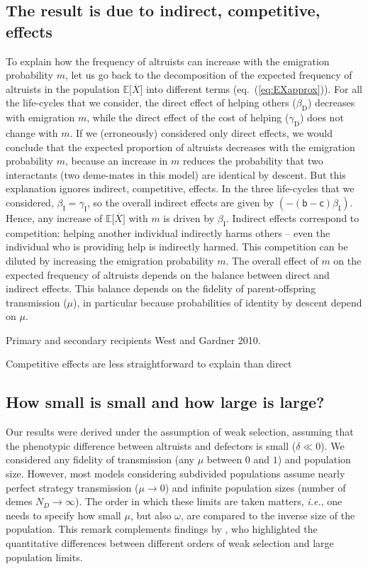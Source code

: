 \documentclass[11pt, letterpaper]{article}
\renewcommand{\eqref}[1]{\textup{{\normalfont eq.~(\ref{#1}}\normalfont)}}
\newcommand{\ie}{\textit{i.e.}}
\newcommand{\Esp}[1]{\mathbb{E}\big[ #1\big]}%
\newcommand{\bb}{\mathsf{b}}
\newcommand{\cc}{\mathsf{c}}
\newcommand{\direct}{\mathrm{D}}
\newcommand{\indirect}{\mathrm{I}}
\newcommand{\Qout}{Q_{\textrm{out}}}
\newcommand{\ndemes}{N_D}
\begin{document}
\subsection*{The result is due to indirect, competitive, effects}
To explain how the frequency of altruists can increase with the emigration probability $m$, let us go back to the decomposition of the expected frequency of altruists in the population $\Esp{\overline{X}}$ into different terms (\eqref{eq:EXapprox}). 
For all the life-cycles that we consider, the direct effect of helping others ($\beta_{\direct}$) decreases with emigration $m$, while the direct effect of the cost of helping ($\gamma_{\direct}$) does not change with $m$. 
If we (erroneously) considered only direct effects, we would conclude that the expected proportion of altruists decreases with the emigration probability $m$, because an increase in $m$ reduces the probability that two interactants (two deme-mates in this model) are identical by descent. 
But this explanation ignores indirect, competitive, effects. In the three life-cycles that we considered, $\beta_{\indirect} = \gamma_{\indirect}$, so the overall indirect effects are given by $(-(\bb-\cc) \beta_{\indirect})$. Hence, any increase of $\Esp{\overline{X}}$ with $m$ is driven by $\beta_{\indirect}$. Indirect effects correspond to competition: helping another individual indirectly harms others -- even the individual who is providing help is indirectly harmed. This competition can be diluted by increasing the emigration probability $m$. 
The overall effect of $m$ on the expected frequency of altruists depends on the balance between direct and indirect effects. This balance depends on the fidelity of parent-offspring transmission ($\mu$), in particular because probabilities of identity by descent depend on $\mu$. 

Primary and secondary recipients West and Gardner 2010. 

Competitive effects are less straightforward to explain than direct

\subsection*{How small is small and how large is large?}
Our results were derived under the assumption of weak selection, assuming that the phenotypic difference between altruists and defectors is small ($\delta \ll 0$). We considered any fidelity of transmission (any $\mu$ between $0$ and $1$) and population size. However, most models considering subdivided populations assume nearly perfect strategy transmission ($\mu \to 0$) and infinite population sizes (number of demes $\ndemes \to \infty$). The order in which these limits are taken matters, \ie, one needs to specify how small $\mu$, but also $\omega$, are compared to the inverse size of the population. This remark complements findings by \citet{SampleAllen2017}, who highlighted the quantitative differences between different orders of weak selection and large population limits. 
\end{document}
